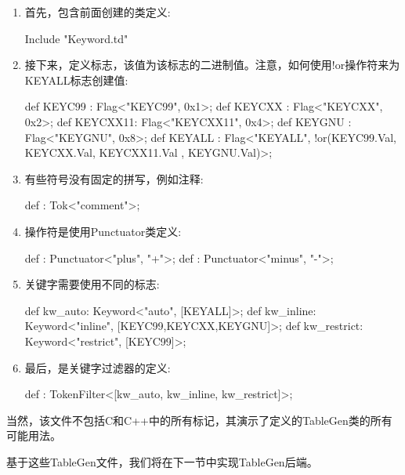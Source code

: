 \begin{enumerate}
\item
首先，包含前面创建的类定义:

\begin{shell}
Include "Keyword.td"
\end{shell}

\item
接下来，定义标志，该值为该标志的二进制值。注意，如何使用!or操作符来为KEYALL标志创建值:

\begin{shell}
def KEYC99 : Flag<"KEYC99", 0x1>;
def KEYCXX : Flag<"KEYCXX", 0x2>;
def KEYCXX11: Flag<"KEYCXX11", 0x4>;
def KEYGNU : Flag<"KEYGNU", 0x8>;
def KEYALL : Flag<"KEYALL",
                    !or(KEYC99.Val, KEYCXX.Val,
                        KEYCXX11.Val , KEYGNU.Val)>;
\end{shell}

\item
有些符号没有固定的拼写，例如注释:

\begin{shell}
def : Tok<"comment">;
\end{shell}

\item
操作符是使用Punctuator类定义:

\begin{shell}
def : Punctuator<"plus", "+">;
def : Punctuator<"minus", "-">;
\end{shell}

\item
关键字需要使用不同的标志:

\begin{shell}
def kw_auto: Keyword<"auto", [KEYALL]>;
def kw_inline: Keyword<"inline", [KEYC99,KEYCXX,KEYGNU]>;
def kw_restrict: Keyword<"restrict", [KEYC99]>;
\end{shell}

\item
最后，是关键字过滤器的定义:

\begin{shell}
def : TokenFilter<[kw_auto, kw_inline, kw_restrict]>;
\end{shell}
\end{enumerate}

当然，该文件不包括C和C++中的所有标记，其演示了定义的TableGen类的所有可能用法。

基于这些TableGen文件，我们将在下一节中实现TableGen后端。


